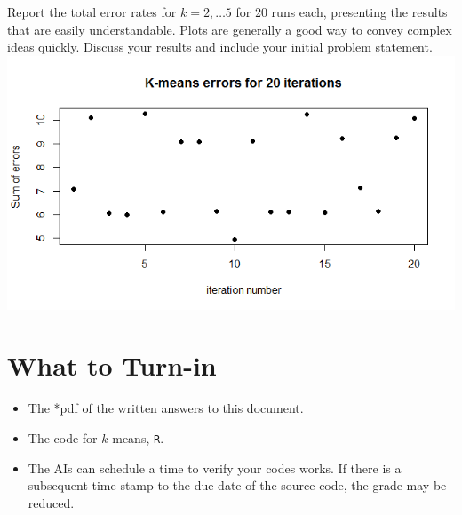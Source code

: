 \documentclass{article}
\begin{document}
\begin{enumerate}
Report the total error rates for $k = 2,\ldots 5$ for 20 runs each, presenting the results that are easily understandable.  Plots are generally a good way to convey complex ideas quickly.  Discuss your results and include your initial problem statement.    \\
\includegraphics[width=\textwidth]{errorplot.png}
\end{enumerate}

\section*{What to Turn-in}
\begin{itemize}
\item The *pdf of the written answers to this document.
\item The code for $k$-means, \texttt{R}.
\item The AIs can schedule a time to verify your codes works.  If there is a subsequent time-stamp to the due date of the source code, the grade may be reduced.  
\end{itemize}
 

\end{document}
